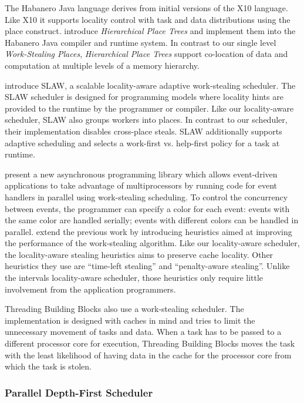 The Habanero Java \cite{HJ} language derives from initial versions of
the X10 language. Like X10 it supports locality control with task and
data distributions using the place construct. \textcite{Yan2009}
introduce \emph{Hierarchical Place Trees} and implement them into the
Habanero Java compiler and runtime system. In contrast to our single
level \emph{Work-Stealing Places}, \emph{Hierarchical Place Trees}
support co-location of data and computation at multiple levels of a
memory hierarchy.

\textcite{Guo2010} introduce SLAW, a scalable locality-aware adaptive
work-stealing scheduler. The SLAW scheduler is designed for
programming models where locality hints are provided to the runtime by
the programmer or compiler. Like our locality-aware scheduler, SLAW
also groups workers into places. In contrast to our scheduler, their
implementation disables cross-place steals. SLAW additionally supports
adaptive scheduling and selects a work-first vs. help-first policy for
a task at runtime.

\textcite{Zeldovich2003} present a new asynchronous programming
library which allows event-driven applications to take advantage of
multiprocessors by running code for event handlers in parallel using
work-stealing scheduling. To control the concurrency between events,
the programmer can specify a color for each event: events with the
same color are handled serially; events with different colors can be
handled in parallel. \textcite{Gaud2010} extend the previous work by
introducing heuristics aimed at improving the performance of the
work-stealing algorithm. Like our locality-aware scheduler, the
locality-aware stealing heuristics aims to preserve cache
locality. Other heuristics they use are ``time-left stealing'' and
``penalty-aware stealing''. Unlike the intervals locality-aware
scheduler, those heuristics only require little involvement from the
application programmers.

Threading Building Blocks \cite{Contreras2008, Reinders2007} also use
a work-stealing scheduler. The implementation is designed with caches
in mind and tries to limit the unnecessary movement of tasks and
data. When a task has to be passed to a different processor core for
execution, Threading Building Blocks moves the task with the least
likelihood of having data in the cache for the processor core from
which the task is stolen.

\subsubsection{Parallel Depth-First Scheduler}

